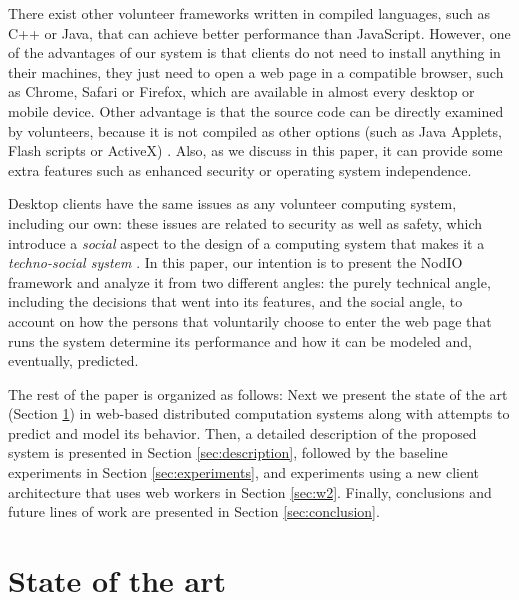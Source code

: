 \documentclass[journal,onecolumn]{IEEEtran}
\begin{document}
There exist other volunteer frameworks written in compiled languages,
such as C++ or Java, that can achieve better performance than
JavaScript. However, one of the advantages of our system is that
clients do not need to install anything in their machines, they just
need to open a web page  
in a compatible browser, such as Chrome, Safari or Firefox, which are
available in almost every desktop or mobile device. Other advantage is
that the source code can be directly examined by volunteers, because it is not
compiled as other options (such as Java Applets, Flash scripts or
ActiveX)
. Also, as we discuss in this paper, it can provide some extra
features such as enhanced security or operating system independence. 

Desktop clients have the same issues as any 
volunteer computing system, including our %
 own: these issues are
related to security as well as
safety, which introduce 
a {\em social} aspect to the design of a
computing system that makes it a {\em techno-social system}
\cite{vespignani2009predicting}. In this paper, our intention is to
present the {\sf NodIO} framework and analyze it from two different
angles: the purely technical angle, including the decisions that went
into its features, and the social angle, to account on how the persons
that voluntarily choose to enter the web page that runs the system
determine its performance and how it can be modeled and, eventually,
predicted.

The rest of the paper is organized as follows: Next we present the
state of the art (Section \ref{sec:soa}) in web-based distributed
computation systems along with attempts to predict and model its behavior. 
Then, a detailed description of the proposed system is presented
in Section \ref{sec:description}, followed by the baseline experiments
in Section \ref{sec:experiments}, and experiments using a new client
architecture that uses web workers in Section \ref{sec:w2}.
Finally, conclusions and future lines of work are presented in Section
\ref{sec:conclusion}. 

\section{State of the art}
\label{sec:soa}
\end{document}
